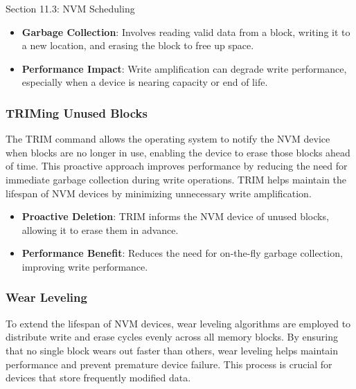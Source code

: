 \begin{notes}{Section 11.3: NVM Scheduling}
\begin{highlight}
        \begin{itemize}
            \item \textbf{Garbage Collection}: Involves reading valid data from a block, writing it to a new location, and erasing the block to free up space.
            \item \textbf{Performance Impact}: Write amplification can degrade write performance, especially when a device is nearing capacity or end of life.
        \end{itemize}
    
    \end{highlight}
    
    \subsubsection*{TRIMing Unused Blocks}
    
    The TRIM command allows the operating system to notify the NVM device when blocks are no longer in use, enabling the device to erase those blocks ahead of time. This proactive approach improves 
    performance by reducing the need for immediate garbage collection during write operations. TRIM helps maintain the lifespan of NVM devices by minimizing unnecessary write amplification.
    
    \begin{highlight}
    
        \begin{itemize}
            \item \textbf{Proactive Deletion}: TRIM informs the NVM device of unused blocks, allowing it to erase them in advance.
            \item \textbf{Performance Benefit}: Reduces the need for on-the-fly garbage collection, improving write performance.
        \end{itemize}
    
    \end{highlight}
    
    \subsubsection*{Wear Leveling}
    
    To extend the lifespan of NVM devices, wear leveling algorithms are employed to distribute write and erase cycles evenly across all memory blocks. By ensuring that no single block wears out faster than 
    others, wear leveling helps maintain performance and prevent premature device failure. This process is crucial for devices that store frequently modified data.
    

\end{notes}
